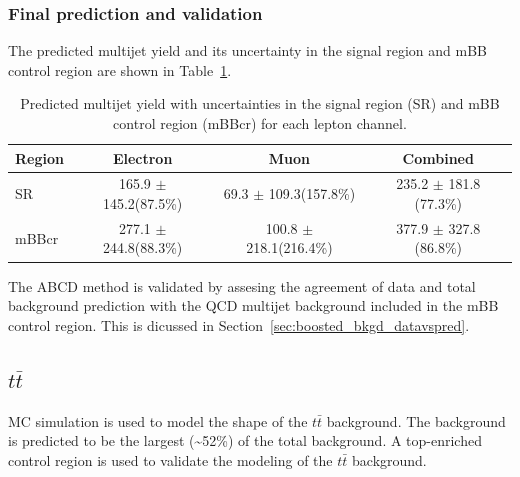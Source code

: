 %
%
\subsubsection{Final prediction and validation}
\label{sec:boosted_bkgd_qcdmultijet_predict_valid}
 
The predicted multijet yield and its uncertainty in the signal region and mBB control region are
shown in Table~\ref{tab:boosted_syst_qcd_norm_unc}.
 
\begin{table}[!htbp]
\begin{center}
\begin{tabular}{l|c|c|c}
Region    & Electron                   & Muon                       & Combined                   \\  
\hline
SR        & 165.9 $\pm$ 145.2(87.5\%) & 69.3 $\pm$ 109.3(157.8\%)   & 235.2 $\pm$ 181.8 (77.3\%) \\
mBBcr     & 277.1 $\pm$ 244.8(88.3\%) & 100.8 $\pm$ 218.1(216.4\%)  & 377.9 $\pm$ 327.8 (86.8\%) \\
\hline
\end{tabular}
\end{center}
\caption{Predicted multijet yield with uncertainties in the signal region (SR) and mBB control region (mBBcr)
for each lepton channel.}
\label{tab:boosted_syst_qcd_norm_unc}
\end{table}
 
The ABCD method is validated by assesing the agreement of data and total background prediction with the QCD multijet background included
in the mBB control region. This is dicussed in Section~\ref{sec:boosted_bkgd_datavspred}.
 
%
%
\subsection{$t\bar{t}$}
\label{sec:boosted_bkgd_ttbar}
 
MC simulation is used to model the shape of the $t\bar{t}$ background. The background
is predicted to be the largest (\textasciitilde 52\%) of the total background. A top-enriched control region
is used to validate the modeling of the $t\bar{t}$ background.%
 
